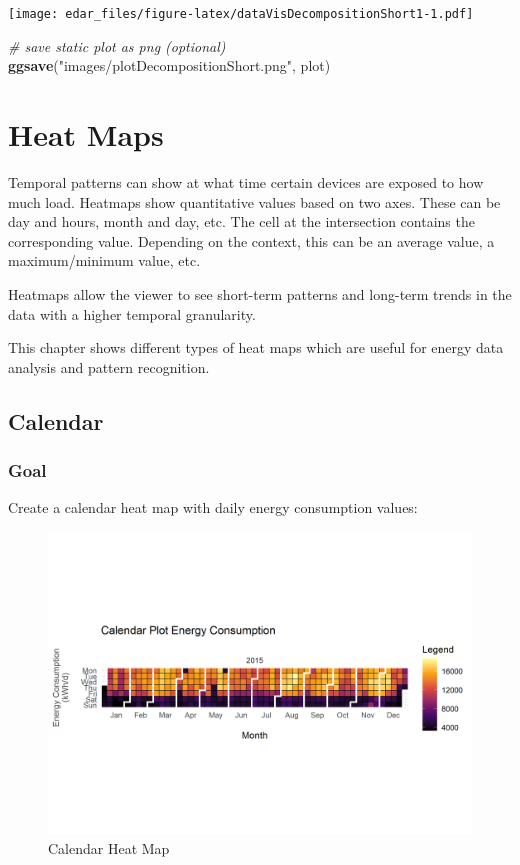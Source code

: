 \documentclass[
  a4paperpaper,
]{book}
\newenvironment{Shaded}{\begin{snugshade}}{\end{snugshade}}
\newcommand{\CommentTok}[1]{\textcolor[rgb]{0.56,0.35,0.01}{\textit{#1}}}
\newcommand{\KeywordTok}[1]{\textcolor[rgb]{0.13,0.29,0.53}{\textbf{#1}}}
\newcommand{\NormalTok}[1]{#1}
\newcommand{\StringTok}[1]{\textcolor[rgb]{0.31,0.60,0.02}{#1}}
\let\oldShaded\Shaded
\let\endoldShaded\endShaded
\renewenvironment{Shaded}{\footnotesize\oldShaded}{\endoldShaded}
\begin{document}
\texttt{[image: edar\_files/figure-latex/dataVisDecompositionShort1-1.pdf]}

\begin{Shaded}
\begin{Highlighting}[]
\CommentTok{# save static plot as png (optional)}
\KeywordTok{ggsave}\NormalTok{(}\StringTok{"images/plotDecompositionShort.png"}\NormalTok{, plot)}
\end{Highlighting}
\end{Shaded}

\hypertarget{heat-maps}{%
\chapter{Heat Maps}\label{heat-maps}}

Temporal patterns can show at what time certain devices are exposed to how much load. Heatmaps show quantitative values based on two axes. These can be day and hours, month and day, etc. The cell at the intersection contains the corresponding value. Depending on the context, this can be an average value, a maximum/minimum value, etc.

Heatmaps allow the viewer to see short-term patterns and long-term trends in the data with a higher temporal granularity.

This chapter shows different types of heat maps which are useful for energy data analysis and pattern recognition.

\newpage

\hypertarget{calendar}{%
\section{Calendar}\label{calendar}}

\hypertarget{goal-6}{%
\subsection{Goal}\label{goal-6}}

Create a calendar heat map with daily energy consumption values:

\begin{figure}
\includegraphics[width=0.7\linewidth]{images/plotHeatMapCalendar} \caption{Calendar Heat Map}\label{fig:unnamed-chunk-15}
\end{figure}
\end{document}
